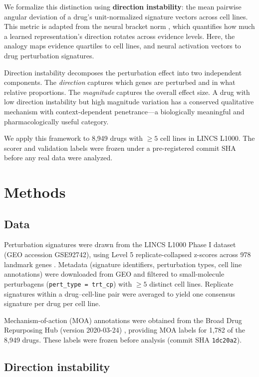 \documentclass[11pt]{article}
\begin{document}
We formalize this distinction using \textbf{direction instability}: the mean
pairwise angular deviation of a drug's unit-normalized signature vectors
across cell lines. This metric is adapted from the neural bracket norm
\citep{tower2026bracket}, which quantifies how much a learned representation's
direction rotates across evidence levels. Here, the analogy maps evidence
quartiles to cell lines, and neural activation vectors to drug perturbation
signatures.

Direction instability decomposes the perturbation effect into two independent
components. The \emph{direction} captures which genes are perturbed and in
what relative proportions. The \emph{magnitude} captures the overall effect
size. A drug with low direction instability but high magnitude variation has
a conserved qualitative mechanism with context-dependent penetrance---a
biologically meaningful and pharmacologically useful category.

We apply this framework to 8{,}949 drugs with $\geq5$ cell lines in LINCS
L1000. The scorer and validation labels were frozen under a pre-registered
commit SHA before any real data were analyzed.

\section{Methods}

\subsection{Data}

Perturbation signatures were drawn from the LINCS L1000 Phase I dataset
(GEO accession GSE92742), using Level 5 replicate-collapsed z-scores across
978 landmark genes \citep{subramanian2017next}. Metadata (signature
identifiers, perturbation types, cell line annotations) were downloaded from
GEO and filtered to small-molecule perturbagens (\texttt{pert\_type =
trt\_cp}) with $\geq5$ distinct cell lines. Replicate signatures within a
drug--cell-line pair were averaged to yield one consensus signature per
drug per cell line.

Mechanism-of-action (MOA) annotations were obtained from the Broad Drug
Repurposing Hub (version 2020-03-24) \citep{corsello2017drug}, providing
MOA labels for 1{,}782 of the 8{,}949 drugs. These labels were frozen
before analysis (commit SHA \texttt{1dc20a2}).

\subsection{Direction instability}
\end{document}

